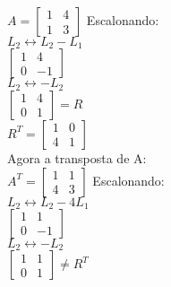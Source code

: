 \documentclass[leqno]{article}
\numberwithin{equation}{section}
\begin{document}
\begin{enumerate}
\begin{enumerate}
			\begin{sol} 
				$A = \begin{bmatrix} 
					1 & 4\\
					1 & 3
				\end{bmatrix}$
			Escalonando:\\
			$L_2 \longleftrightarrow L_2 - L_1$\\
			\newline
			$\begin{bmatrix} 
				1 & 4\\
				0 & -1
			\end{bmatrix}$\\
			\newline
			$L_2 \longleftrightarrow -L_2$\\
			\newline
			$\begin{bmatrix} 
				1 & 4\\
				0 & 1
			\end{bmatrix} = R$\\
			\newline
			$R^T = \begin{bmatrix} 
				1 & 0\\
				4 & 1
			\end{bmatrix} $\\
			\newline
			Agora a transposta de A:\\
			\newline
			$A^T = \begin{bmatrix} 
				1 & 1\\
				4 & 3
			\end{bmatrix}$
			Escalonando:\\
			\newline
			$L_2 \longleftrightarrow L_2 - 4L_1$\\
			\newline
			$\begin{bmatrix} 
				1 & 1\\
				0 & -1
			\end{bmatrix}$\\
			\newline
			$L_2 \longleftrightarrow -L_2$\\
			\newline
			$\begin{bmatrix} 
				1 & 1\\
				0 & 1
			\end{bmatrix} \neq R^T$
			\end{sol} 
		\end{enumerate}
		

\end{enumerate}
\end{document}
